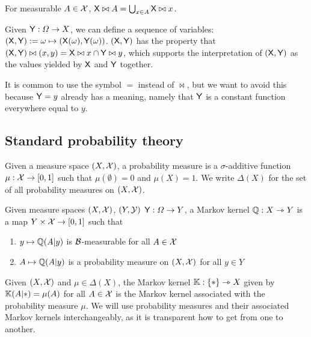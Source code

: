 For measurable $A\in \mathcal{X}$, $\mathsf{X}\bowtie A=\bigcup_{x\in A} \mathsf{X}\bowtie x$. 

Given $\mathsf{Y}:\Omega\to X$, we can define a sequence of variables: $(\mathsf{X},\mathsf{Y}):=\omega\mapsto (\mathsf{X}(\omega),\mathsf{Y}(\omega))$. $(\mathsf{X},\mathsf{Y})$ has the property that $(\mathsf{X},\mathsf{Y})\bowtie (x,y)= \mathsf{X}\bowtie x\cap \mathsf{Y}\bowtie y$, which supports the interpretation of $(\mathsf{X},\mathsf{Y})$ as the values yielded by $\mathsf{X}$ and $\mathsf{Y}$ together.

It is common to use the symbol $=$ instead of $\bowtie$, but we want to avoid this because $\mathsf{Y}=y$ already has a meaning, namely that $\mathsf{Y}$ is a constant function everywhere equal to $y$. 

\subsection{Standard probability theory}

\begin{definition}
Given a measure space $(X,\mathcal{X})$, a probability measure is a $\sigma$-additive function $\mu:\mathcal{X}\to [0,1]$ such that $\mu(\emptyset)=0$ and $\mu(X)=1$. We write $\Delta(X)$ for the set of all probability measures on $(X,\mathcal{X})$.
\end{definition}

\begin{definition}
Given measure spaces $(X,\mathcal{X})$, $(Y,\mathcal{Y})$ $\mathsf{Y}:\Omega\to Y$, a Markov kernel $\mathbb{Q}:X\rightarrowtriangle Y$ is a map $Y\times \mathcal{X}\to [0,1]$ such that
\begin{enumerate}
	\item $y\mapsto \mathbb{Q}(A|y)$ is $\mathcal{B}$-measurable for all $A\in \mathcal{X}$
	\item $A\mapsto \mathbb{Q}(A|y)$ is a probability measure on $(X,\mathcal{X})$ for all $y\in Y$
\end{enumerate}
\end{definition}

\begin{definition}
Given $(X,\mathcal{X})$ and $\mu\in \Delta(X)$, the Markov kernel $\mathbb{K}:\{*\}\rightarrowtriangle X$ given by $\mathbb{K}(A|*)=\mu(A)$ for all $A\in \mathcal{X}$ is the Markov kernel associated with the probability measure $\mu$. We will use probability measures and their associated Markov kernels interchangeably, as it is transparent how to get from one to another.
\end{definition}

